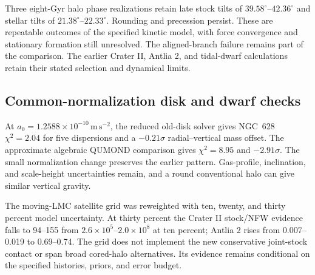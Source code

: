 Three eight-Gyr halo phase realizations retain late stock tilts of
$39.58^\circ$--$42.36^\circ$ and stellar tilts of
$21.38^\circ$--$22.33^\circ$. Rounding and precession persist.
These are repeatable outcomes of the specified kinetic model, with
force convergence and stationary formation still unresolved. The
aligned-branch failure remains part of the comparison. The earlier
Crater II, Antlia 2, and tidal-dwarf calculations retain their stated
selection and dynamical limits. 


\subsection{Common-normalization disk and dwarf checks}
At $a_0=1.2588\times10^{-10}\,\mathrm{m\,s^{-2}}$, the reduced
old-disk solver gives NGC~628 $\chi^2=2.04$ for five dispersions and
a $-0.21\sigma$ radial--vertical mass offset. The approximate algebraic
QUMOND comparison gives $\chi^2=8.95$ and $-2.91\sigma$. The small
normalization change preserves the earlier pattern. Gas-profile,
inclination, and scale-height uncertainties remain, and a round
conventional halo can give similar vertical gravity.

The moving-LMC satellite grid was reweighted with ten, twenty, and
thirty percent model uncertainty. At thirty percent the Crater II
stock/NFW evidence falls to 94--155 from $2.6\times10^5$--$2.0\times10^8$
at ten percent; Antlia 2 rises from 0.007--0.019 to 0.69--0.74.
The grid does not implement the new conservative joint-stock contact
or span broad cored-halo alternatives. Its evidence remains conditional
on the specified histories, priors, and error budget. 
